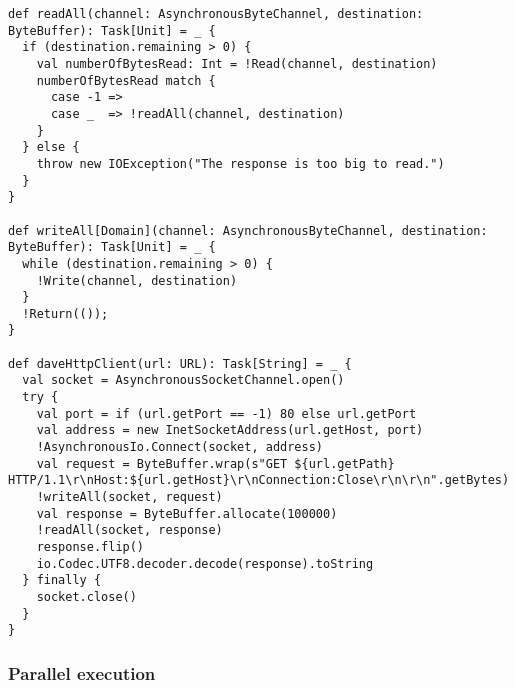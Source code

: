 
\begin{lstlisting}[caption={Dave's HTTP client},label={httpClient}]
def readAll(channel: AsynchronousByteChannel, destination: ByteBuffer): Task[Unit] = _ {
  if (destination.remaining > 0) {
    val numberOfBytesRead: Int = !Read(channel, destination)
    numberOfBytesRead match {
      case -1 =>
      case _  => !readAll(channel, destination)
    }
  } else {
    throw new IOException("The response is too big to read.")
  }
}

def writeAll[Domain](channel: AsynchronousByteChannel, destination: ByteBuffer): Task[Unit] = _ {
  while (destination.remaining > 0) {
    !Write(channel, destination)
  }
  !Return(());
}

def daveHttpClient(url: URL): Task[String] = _ {
  val socket = AsynchronousSocketChannel.open()
  try {
    val port = if (url.getPort == -1) 80 else url.getPort
    val address = new InetSocketAddress(url.getHost, port)
    !AsynchronousIo.Connect(socket, address)
    val request = ByteBuffer.wrap(s"GET ${url.getPath} HTTP/1.1\r\nHost:${url.getHost}\r\nConnection:Close\r\n\r\n".getBytes)
    !writeAll(socket, request)
    val response = ByteBuffer.allocate(100000)
    !readAll(socket, response)
    response.flip()
    io.Codec.UTF8.decoder.decode(response).toString
  } finally {
    socket.close()
  }
}
\end{lstlisting}

\subsubsection{Parallel execution}\label{Parallel execution}







